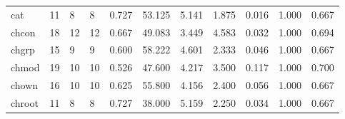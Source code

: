 \begin{longtable}{lp{1.2cm}p{1.2cm}p{1.2cm}p{1.2cm}p{1.2cm}p{1.2cm}p{1.2cm}p{1.2cm}p{1.2cm}p{1.2cm}}
cat       &                           11 &                  8 &                                 8 &                                      0.727 &                                 53.125 &                                        5.141 &                             1.875 &                                   0.016 &                              1.000 &                                              0.667 \\
chcon     &                           18 &                 12 &                                12 &                                      0.667 &                                 49.083 &                                        3.449 &                             4.583 &                                   0.032 &                              1.000 &                                              0.694 \\
chgrp     &                           15 &                  9 &                                 9 &                                      0.600 &                                 58.222 &                                        4.601 &                             2.333 &                                   0.046 &                              1.000 &                                              0.667 \\
chmod     &                           19 &                 10 &                                10 &                                      0.526 &                                 47.600 &                                        4.217 &                             3.500 &                                   0.117 &                              1.000 &                                              0.700 \\
chown     &                           16 &                 10 &                                10 &                                      0.625 &                                 55.800 &                                        4.156 &                             2.400 &                                   0.056 &                              1.000 &                                              0.667 \\
chroot    &                           11 &                  8 &                                 8 &                                      0.727 &                                 38.000 &                                        5.159 &                             2.250 &                                   0.034 &                              1.000 &                                              0.667 \\

\end{longtable}

